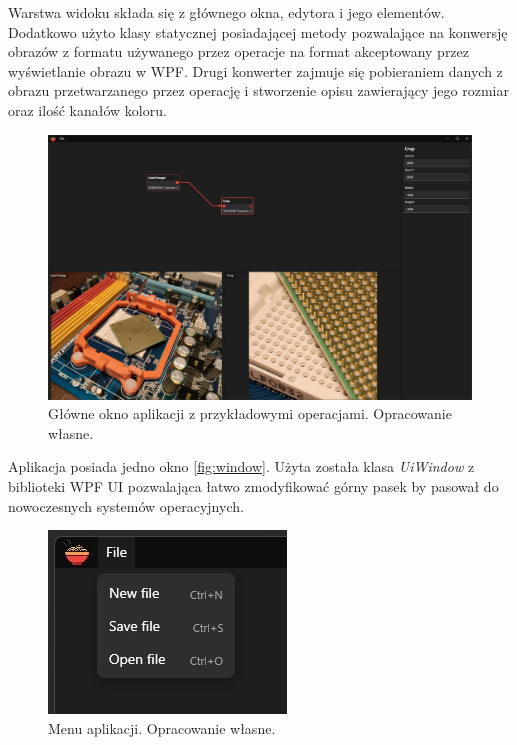 Warstwa widoku składa się z głównego okna, edytora i jego elementów.
Dodatkowo użyto klasy statycznej posiadającej metody pozwalające na konwersję obrazów z formatu używanego przez operacje na format akceptowany przez wyświetlanie obrazu w WPF.
Drugi konwerter zajmuje się pobieraniem danych z obrazu przetwarzanego przez operację i stworzenie opisu zawierający jego rozmiar oraz ilość kanałów koloru.

\begin{figure}[H]
    \centering
    \includegraphics[width=1\linewidth]{images/Picture13.jpg}
    \caption{Główne okno aplikacji z przykładowymi operacjami. Opracowanie własne.}
    \label{fig:window}
\end{figure}

Aplikacja posiada jedno okno \autoref{fig:window}. 
Użyta została klasa \textit{UiWindow} z biblioteki WPF UI \cite{wpfui} pozwalająca łatwo zmodyfikować górny pasek by pasował do nowoczesnych systemów operacyjnych. 

\begin{figure}[H]
    \centering
    \includegraphics[width=0.6\linewidth]{images/Picture14.jpg}
    \caption{Menu aplikacji. Opracowanie własne.}
    \label{fig:mainmenu}
\end{figure}

